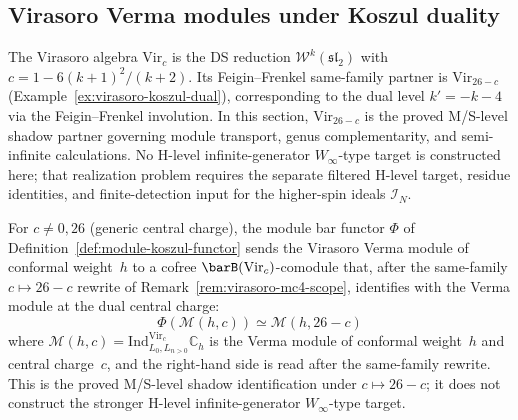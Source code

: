 \subsection{Virasoro Verma modules under Koszul duality}
\label{sec:virasoro-verma-koszul}

The Virasoro algebra $\mathrm{Vir}_c$ is the DS reduction
$\mathcal{W}^k(\mathfrak{sl}_2)$ with $c = 1 - 6(k+1)^2/(k+2)$.
Its Feigin--Frenkel same-family partner is $\mathrm{Vir}_{26-c}$
(Example~\ref{ex:virasoro-koszul-dual}), corresponding to the
dual level $k' = -k-4$ via the Feigin--Frenkel involution.
In this section, $\mathrm{Vir}_{26-c}$ is the proved M/S-level shadow
partner governing module transport, genus complementarity, and
semi-infinite calculations. No H-level infinite-generator
$W_\infty$-type target is constructed here; that realization problem
requires the separate filtered H-level target, residue identities, and
finite-detection input for the higher-spin ideals $\mathcal{I}_N$.

\begin{proposition}
\label{prop:virasoro-verma-koszul}
For $c \neq 0, 26$ (generic central charge), the module bar functor
$\Phi$ of Definition~\ref{def:module-koszul-functor} sends the
Virasoro Verma module of conformal weight~$h$ to a cofree
$\barB(\mathrm{Vir}_c)$-comodule that, after the same-family
$c \mapsto 26-c$ rewrite of
Remark~\ref{rem:virasoro-mc4-scope}, identifies with the Verma module
at the dual central charge:
\begin{equation}\label{eq:virasoro-verma-koszul}
\Phi(\mathcal{M}(h, c)) \simeq \mathcal{M}(h, 26-c)
\end{equation}
where $\mathcal{M}(h, c) = \mathrm{Ind}_{L_0, L_{n>0}}^{\mathrm{Vir}_c}
\mathbb{C}_h$ is the Verma module of conformal weight~$h$ and
central charge~$c$, and the right-hand side is read after the
same-family rewrite. This is the proved M/S-level shadow
identification under $c \mapsto 26-c$; it does not construct the
stronger H-level infinite-generator $W_\infty$-type target.
\end{proposition}

